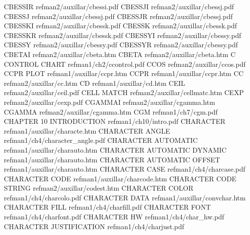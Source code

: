 CBESSIR                                 refman2/auxillar/cbessi.pdf
CBESSJI                                 refman2/auxillar/cbessj.pdf
CBESSJ                                  refman2/auxillar/cbessj.pdf
CBESSJR                                 refman2/auxillar/cbessj.pdf
CBESSKI                                 refman2/auxillar/cbessk.pdf
CBESSK                                  refman2/auxillar/cbessk.pdf
CBESSKR                                 refman2/auxillar/cbessk.pdf
CBESSYI                                 refman2/auxillar/cbessy.pdf
CBESSY                                  refman2/auxillar/cbessy.pdf
CBESSYR                                 refman2/auxillar/cbessy.pdf
CBETAI                                  refman2/auxillar/cbeta.htm
CBETA                                   refman2/auxillar/cbeta.htm
C CONTROL CHART                         refman1/ch2/ccontrol.pdf
CCOS                                    refman2/auxillar/ccos.pdf
CCPR PLOT                               refman1/auxillar/ccpr.htm
CCPR                                    refman1/auxillar/ccpr.htm
CC                                      refman2/auxillar/cc.htm
CD                                      refman1/auxillar/cd.htm
CEIL                                    refman2/auxillar/ceil.pdf
CELL MATCH                              refman2/auxillar/cellmatc.htm
CEXP                                    refman2/auxillar/cexp.pdf
CGAMMAI                                 refman2/auxillar/cgamma.htm
CGAMMA                                  refman2/auxillar/cgamma.htm
CGM                                     refman1/ch7/cgm.pdf
CHAPTER 10 INTRODUCTION                 refman1/ch10/intro.pdf
CHARACTER                               refman1/auxillar/characte.htm
CHARACTER ANGLE                         refman1/ch4/character_angle.pdf
CHARACTER AUTOMATIC                     refman1/auxillar/charauto.htm
CHARACTER AUTOMATIC DYNAMIC             refman1/auxillar/charauto.htm
CHARACTER AUTOMATIC OFFSET              refman1/auxillar/charauto.htm
CHARACTER CASE                          refman1/ch4/charcase.pdf
CHARACTER CODE                          refman1/auxillar/charcode.htm
CHARACTER CODE STRING                   refman2/auxillar/codest.htm
CHARACTER COLOR                         refman1/ch4/charcolo.pdf
CHARACTER DATA                          refman1/auxillar/convchar.htm
CHARACTER FILL                          refman1/ch4/charfill.pdf
CHARACTER FONT                          refman1/ch4/charfont.pdf
CHARACTER HW                            refman1/ch4/char_hw.pdf
CHARACTER JUSTIFICATION                 refman1/ch4/charjust.pdf
